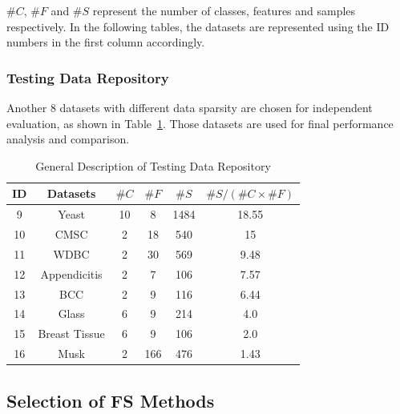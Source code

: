 \documentclass[conference]{IEEEtran}
\begin{document}
$\#C$, $\#F$ and $\#S$ represent the number of classes, features and samples respectively. In the following tables, the datasets are represented using the ID numbers in the first column accordingly. 

\subsubsection{\textbf{Testing Data Repository}}
Another 8 datasets with different data sparsity are chosen for independent evaluation, as shown in Table~\ref{data_testing}. Those datasets are used for final performance analysis and comparison.

\begin{table}[h]
	\centering
	\caption{General Description of Testing Data Repository}
	\begin{tabular}{c c c c c c}
		\toprule
		\textbf{ID}   & \textbf{Datasets}  & \textbf{$\#C$}     &   $\#F$           &   $\#S$       &   $ \#S / (\#C \times \#F)$  \\
		\midrule
		9      & Yeast                         & 10              & 8                    &  1484        &   18.55 \\
		10      & CMSC                       & 2                & 18                  &  540           &   15     \\
		11      & WDBC                	     & 2                & 30                  &  569          &    9.48 \\ 		
		12      & Appendicitis              & 2                & 7                    & 106           &   7.57    \\
		13      & BCC                          & 2                & 9                    &  116           &   6.44   \\
		14      & Glass      	                 & 6                 & 9                    & 214           &    4.0     \\ 
		15      & Breast Tissue             & 6                 & 9                     & 106          &    2.0     \\ 
		16   &  Musk                            & 2                &  166                    &  476      &  1.43  \\
		\bottomrule
	\end{tabular}
	\label{data_testing}
\end{table}


\subsection{Selection of FS Methods}
\end{document}
